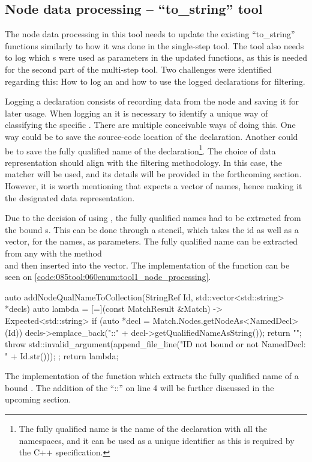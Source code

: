 \subsection{Node data processing -- ``to\_string'' tool}
The node data processing in this tool needs to update the existing ``to\_string'' functions similarly to how it was done in the single-step tool.
The tool also needs to log which s were used as parameters in the updated functions, as this is needed for the second part of the multi-step tool.
Two challenges were identified regarding this: How to log an  and how to use the logged declarations for filtering.

Logging a declaration consists of recording data from the node and saving it for later usage.
When logging an  it is necessary to identify a unique way of classifying the specific . There are multiple conceivable ways of doing this.
One way could be to save the source-code location of the declaration. Another could be to save the fully qualified name of the declaration\footnote{The fully qualified name is the name of the declaration with all the namespaces, and it can be used as a unique identifier as this is required by the C++ specification.}.
The choice of data representation should align with the filtering methodology. In this case, the matcher  will be used, and its details will be provided in the forthcoming section.
However, it is worth mentioning that  expects a vector of names, hence making it the designated data representation.

Due to the decision of using , the fully qualified names had to be extracted from the bound s.
This can be done through a stencil, which takes the id as well as a vector, for the names, as parameters.
The fully qualified name can be extracted from any  with the method\\
 and then inserted into the vector. 
The implementation of the  function can be seen on \cref{code:085tool:060enum:tool1_node_processing}.

\begin{listing}[H]
  \begin{cppcode}
auto addNodeQualNameToCollection(StringRef Id, std::vector<std::string> *decls) {
	auto lambda = [=](const MatchResult &Match) -> Expected<std::string> {
		if (auto *decl = Match.Nodes.getNodeAs<NamedDecl>(Id)) {
			decls->emplace_back("::" + decl->getQualifiedNameAsString());
			return "";
		}
		throw std::invalid_argument(append_file_line("ID not bound or not NamedDecl: " + Id.str()));
	};
	return lambda;
}
  \end{cppcode}
  \caption{The implementation of the function which extracts the fully qualified name of a bound . The addition of the ``::'' on line 4 will be further discussed in the upcoming section.}
  \label{code:085tool:060enum:tool1_node_processing}
\end{listing}

